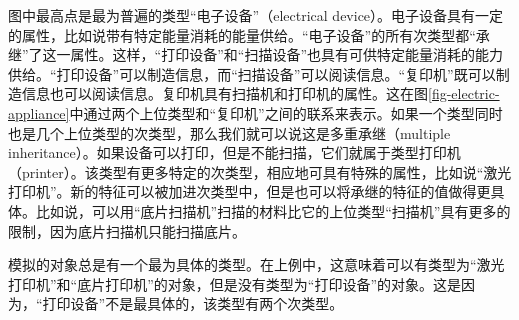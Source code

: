 图中最高点是最为普遍的类型“电子设备”（electrical device）。电子设备具有一定的属性，比如说带有特定能量消耗的能量供给。“电子设备”的所有次类型都“承继”了这一属性。这样，“打印设备”和“扫描设备”也具有可供特定能量消耗的能力供给。“打印设备”可以制造信息，而“扫描设备”可以阅读信息。“复印机”既可以制造信息也可以阅读信息。复印机具有扫描机和打印机的属性。这在图\ref{fig-electric-appliance}中通过两个上位类型和“复印机”之间的联系来表示。如果一个类型同时也是几个上位类型的次类型，那么我们就可以说这是多重承继（multiple inheritance）。如果设备可以打印，但是不能扫描，它们就属于类型打印机（printer）。该类型有更多特定的次类型，相应地可具有特殊的属性，比如说“激光打印机”。新的特征可以被加进次类型中，但是也可以将承继的特征的值做得更具体。比如说，可以用“底片扫描机”扫描的材料比它的上位类型“扫描机”具有更多的限制，因为底片扫描机只能扫描底片。

模拟的对象总是有一个最为具体的类型。在上例中，这意味着可以有类型为“激光打印机”和“底片打印机”的对象，但是没有类型为“打印设备”的对象。这是因为，“打印设备”不是最具体的，该类型有两个次类型。

